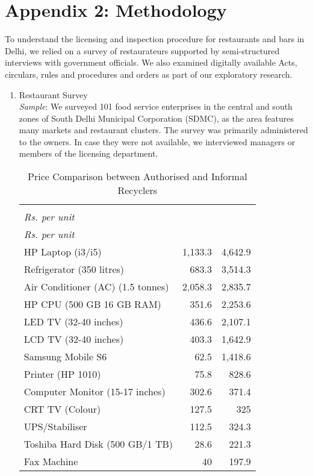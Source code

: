 \documentclass[a4paper, 12pt]{article}
\begin{document}
		\section*{Appendix 2: Methodology}
		   \label {Appendix 2}
		To understand the licensing and inspection procedure for restaurants and bars in Delhi, we relied on a survey of restaurateurs supported by semi-structured interviews with government officials. We also examined digitally available Acts, circulars, rules and procedures and orders as part of our exploratory research.
		\begin{enumerate} [A,B,C]
		\item Restaurant Survey\\
			\textit{Sample}: We surveyed 101 food service enterprises in the central and south zones of South Delhi Municipal Corporation (SDMC), as the area features many markets and restaurant clusters. The survey was primarily administered to the owners. In case they were not available, we interviewed managers or members of the licensing department.\\

   
		\begin{table}[htpb]
		\raggedright
		\caption{Price Comparison between Authorised and Informal Recyclers}
		\begin{tabular}{ l  r  r }
		\thead{\normalsize{Item}} & \thead{\normalsize{Authorised Recycler} \\ \footnotesize\textit{Rs. per unit}} & 				\thead{\normalsize{Informal Recycler} \\ \footnotesize\textit{Rs. per unit}} \\
		\hline

			HP Laptop (i3/i5) & 1,133.3 & 4,642.9\\
			Refrigerator (350 litres) & 683.3 & 3,514.3 \\
			Air Conditioner (AC) (1.5 tonnes) & 2,058.3 & 2,835.7 \\
			HP CPU (500 GB 16 GB RAM) & 351.6  & 2,253.6 \\
			LED TV (32-40 inches) & 436.6 & 2,107.1 \\
			LCD TV (32-40 inches) & 403.3 & 1,642.9 \\
			Samsung Mobile S6 & 62.5 & 1,418.6 \\
			Printer (HP 1010) & 75.8 & 828.6 \\
			Computer Monitor (15-17 inches) & 302.6 & 371.4\\
			CRT TV (Colour) & 127.5 & 325 \\
			UPS/Stabiliser & 112.5 & 324.3 \\
			Toshiba Hard Disk (500 GB/1 TB) & 28.6 & 221.3 \\
			Fax Machine & 40  & 197.9 \\ 
		\end{tabular}
		\end{table}
		

\end{enumerate}
\end{document}
